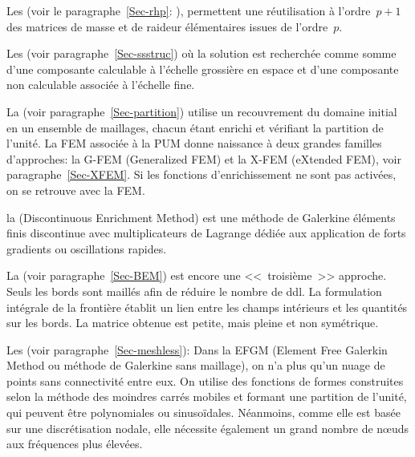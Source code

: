 \medskip
Les 
(voir le paragraphe~\ref{Sec-rhp}:
), permettent une réutilisation à l'ordre~$p+1$ des matrices
de masse et de raideur élémentaires issues de l'ordre~$p$.

Les  (voir paragraphe~\ref{Sec-ssstruc}) où la solution est
recherchée comme somme d'une composante calculable à l'échelle grossière en espace et
d'une composante non calculable associée à l'échelle fine.

La  (voir paragraphe~\ref{Sec-partition}) utilise un recouvrement
du domaine initial en un ensemble de maillages, chacun étant enrichi et vérifiant la partition de l'unité.
La FEM associée à la PUM donne naissance à deux grandes familles d'approches:
la G-FEM (Generalized FEM) et la X-FEM (eXtended FEM),
voir paragraphe~\ref{Sec-XFEM}.
Si les fonctions d'enrichissement ne sont pas activées, on se retrouve avec la FEM.

la 
(Discontinuous Enrichment Method) est une méthode de Galerkine éléments finis
discontinue avec multiplicateurs de Lagrange
dédiée aux application de forts gradients ou oscillations rapides.

\bigskip
La 
(voir paragraphe~\ref{Sec-BEM}) est encore une <<~troisième~>> approche.
Seuls les bords sont maillés afin de réduire le nombre de ddl.
La formulation intégrale de la frontière établit un lien entre les champs intérieurs
et les quantités sur les bords.
La matrice obtenue est petite, mais pleine et non symétrique.

\bigskip
Les  (voir paragraphe~\ref{Sec-meshless}):
Dans la EFGM (Element Free Galerkin Method ou méthode de Galerkine sans maillage),
on n'a plus qu'un nuage de points sans connectivité entre eux.
On utilise des fonctions de formes construites selon la méthode des moindres carrés mobiles et
formant une partition de l'unité, qui peuvent être polynomiales
ou sinusoïdales.
Néanmoins, comme elle est basée sur une discrétisation nodale, elle nécessite également
un grand nombre de nœuds aux fréquences plus élevées.

